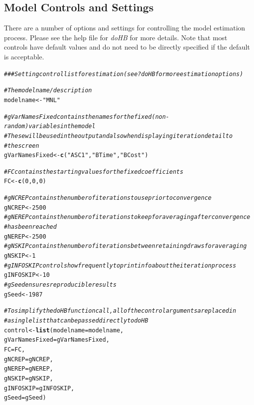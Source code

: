 \documentclass{article}\usepackage[]{graphicx}\usepackage[]{color}
\makeatletter
\newcommand{\hlnum}[1]{\textcolor[rgb]{0.686,0.059,0.569}{#1}}%
\newcommand{\hlstr}[1]{\textcolor[rgb]{0.192,0.494,0.8}{#1}}%
\newcommand{\hlcom}[1]{\textcolor[rgb]{0.678,0.584,0.686}{\textit{#1}}}%
\newcommand{\hlstd}[1]{\textcolor[rgb]{0.345,0.345,0.345}{#1}}%
\newcommand{\hlkwb}[1]{\textcolor[rgb]{0.69,0.353,0.396}{#1}}%
\newcommand{\hlkwc}[1]{\textcolor[rgb]{0.333,0.667,0.333}{#1}}%
\newcommand{\hlkwd}[1]{\textcolor[rgb]{0.737,0.353,0.396}{\textbf{#1}}}%
\newenvironment{kframe}{%
 \def\at@end@of@kframe{}%
 \ifinner\ifhmode%
  \def\at@end@of@kframe{\end{minipage}}%
  \begin{minipage}{\columnwidth}%
 \fi\fi%
 \def\FrameCommand##1{\hskip\@totalleftmargin \hskip-\fboxsep
 \colorbox{shadecolor}{##1}\hskip-\fboxsep
     \hskip-\linewidth \hskip-\@totalleftmargin \hskip\columnwidth}%
 \MakeFramed {\advance\hsize-\width
   \@totalleftmargin\z@ \linewidth\hsize
   \@setminipage}}%
 {\par\unskip\endMakeFramed%
 \at@end@of@kframe}
\newenvironment{knitrout}{}{} %
\makeatother
\begin{document}
\subsection*{Model Controls and Settings}

There are a number of options and settings for controlling the model estimation process. Please see the help file for \emph{doHB} for more details. Note that most controls have default values and do not need to be directly specified if the default is acceptable.

\begin{knitrout}
\color{fgcolor}\begin{kframe}
\begin{alltt}
\hlcom{### Setting control list for estimation (see ?doHB for more estimation options)}

\hlcom{# The model name/description}
\hlstd{modelname} \hlkwb{<-} \hlstr{"MNL"}

\hlcom{# gVarNamesFixed contains the names for the fixed (non-random) variables in the model}
\hlcom{# These will be used in the output and also when displaying iteration detail to }
\hlcom{# the screen}
\hlstd{gVarNamesFixed} \hlkwb{<-} \hlkwd{c}\hlstd{(}\hlstr{"ASC1"}\hlstd{,} \hlstr{"BTime"}\hlstd{,} \hlstr{"BCost"}\hlstd{)}

\hlcom{# FC contains the starting values for the fixed coefficients}
\hlstd{FC} \hlkwb{<-} \hlkwd{c}\hlstd{(}\hlnum{0}\hlstd{,} \hlnum{0}\hlstd{,} \hlnum{0}\hlstd{)}

\hlcom{# gNCREP contains the number of iterations to use prior to convergence}
\hlstd{gNCREP} \hlkwb{<-} \hlnum{2500}
\hlcom{# gNEREP contains the number of iterations to keep for averaging after convergence }
\hlcom{# has been reached}
\hlstd{gNEREP} \hlkwb{<-} \hlnum{2500}
\hlcom{# gNSKIP contains the number of iterations between retaining draws for averaging}
\hlstd{gNSKIP} \hlkwb{<-} \hlnum{1}
\hlcom{# gINFOSKIP controls how frequently to print info about the iteration process}
\hlstd{gINFOSKIP} \hlkwb{<-} \hlnum{10}
\hlcom{# gSeed ensures reproducible results}
\hlstd{gSeed} \hlkwb{<-} \hlnum{1987}

\hlcom{# To simplify the doHB function call, all of the control arguments are placed in }
\hlcom{# a single list that can be passed directly to doHB}
\hlstd{control} \hlkwb{<-} \hlkwd{list}\hlstd{(}\hlkwc{modelname} \hlstd{= modelname,}
                \hlkwc{gVarNamesFixed} \hlstd{= gVarNamesFixed,}
                \hlkwc{FC} \hlstd{= FC,}
                \hlkwc{gNCREP} \hlstd{= gNCREP,}
                \hlkwc{gNEREP} \hlstd{= gNEREP,}
                \hlkwc{gNSKIP} \hlstd{= gNSKIP,}
                \hlkwc{gINFOSKIP} \hlstd{= gINFOSKIP,}
                \hlkwc{gSeed} \hlstd{= gSeed)}
\end{alltt}
\end{kframe}
\end{knitrout}
\end{document}
